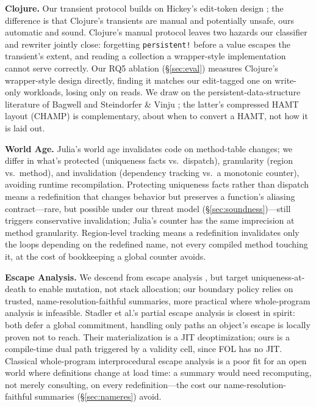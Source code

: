 \documentclass[sigplan,review,anonymous]{acmart}
\begin{document}
\textbf{Clojure.} Our transient protocol builds on Hickey's edit-token design \cite{hickey2009clojure}; the difference is that Clojure's transients are manual and potentially unsafe, ours automatic and sound. Clojure's manual protocol leaves two hazards our classifier and rewriter jointly close: forgetting \texttt{persistent!} before a value escapes the transient's extent, and reading a collection a wrapper-style implementation cannot serve correctly. Our RQ5 ablation (§\ref{sec:eval}) measures Clojure's wrapper-style design directly, finding it matches our edit-tagged one on write-only workloads, losing only on reads. We draw on the persistent-data-structure literature of Bagwell \cite{bagwell2001ideal} and Steindorfer \& Vinju \cite{steindorfer2015optimizing}; the latter's compressed HAMT layout (CHAMP) is complementary, about when to convert a HAMT, not how it is laid out.

\textbf{World Age.} Julia's world age \cite{belyakova2020jit} invalidates code on method-table changes; we differ in what's protected (uniqueness facts vs.\ dispatch), granularity (region vs.\ method), and invalidation (dependency tracking vs.\ a monotonic counter), avoiding runtime recompilation. Protecting uniqueness facts rather than dispatch means a redefinition that changes behavior but preserves a function's aliasing contract---rare, but possible under our threat model (§\ref{sec:soundness})---still triggers conservative invalidation; Julia's counter has the same imprecision at method granularity. Region-level tracking means a redefinition invalidates only the loops depending on the redefined name, not every compiled method touching it, at the cost of bookkeeping a global counter avoids.

\textbf{Escape Analysis.} We descend from escape analysis \cite{blanchet2003escape, choi1999escape, stadler2014partial}, but target uniqueness-at-death to enable mutation, not stack allocation; our boundary policy relies on trusted, name-resolution-faithful summaries, more practical where whole-program analysis is infeasible. Stadler et al.'s partial escape analysis \cite{stadler2014partial} is closest in spirit: both defer a global commitment, handling only paths an object's escape is locally proven not to reach. Their materialization is a JIT deoptimization; ours is a compile-time dual path triggered by a validity cell, since FOL has no JIT. Classical whole-program interprocedural escape analysis \cite{blanchet2003escape, choi1999escape} is a poor fit for an open world where definitions change at load time: a summary would need recomputing, not merely consulting, on every redefinition---the cost our name-resolution-faithful summaries (§\ref{sec:nameres}) avoid.
\end{document}
